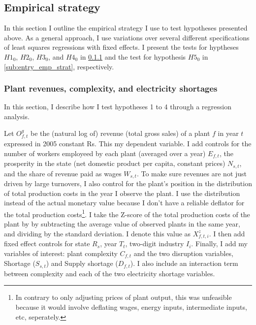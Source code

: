 \documentclass[11pt]{article}
\begin{document}
\subsection{Empirical strategy}
\label{sec:emp_strat}

In this section I outline the empirical strategy I use to test hypotheses presented above. As a general approach, I use variations over several different specifications of least squares regressions with fixed effects. I present the tests for hyptheses $H1_0$, $H2_0$, $H3_0$, and $H4_0$ in \ref{sub:interaction_emp_strat} and the test for hypothesis $H5_0$ in \ref{sub:entry_emp_strat}, respectively.

\subsubsection{Plant revenues, complexity, and electricity shortages}\label{sub:interaction_emp_strat}

In this section, I describe how I test hypotheses 1 to 4 through a regression analysis.

Let $O^{g}_{f,t}$ be the (natural log of) revenue (total gross sales) of a plant $f$ in year $t$ expressed in 2005 constant Rs. This my dependent variable. I add controls for the number of workers employeed by each plant (averaged over a year) $E_{f,t}$, the prosperity in the state (net domestic product per capita, constant prices) $N_{s,t}$, and the share of revenue paid as wages $W_{s,t}$. To make sure revenues are not just driven by large turnovers, I also control for the plant's position in the distribution of total production costs in the year I observe the plant. I use the distribution instead of the actual monetary value because I don't have a reliable deflator for the total production costs\footnote{In contrary to only adjusting prices of plant output, this was unfeasible because it would involve deflating wages, energy inputs, intermediate inputs, etc, seperately.}. I take the Z-score of the total production costs of the plant by by subtracting the average value of observed plants in the same year, and dividing by the standard deviation. I denote this value as $X^{z}_{f,t,i}$. I then add fixed effect controls for state $R_{s}$, year $T_{t}$, two-digit industry $I_i$. Finally, I add my variables of interest: plant complexity $C_{f,t}$ and the two disruption variables, Shortage ($S_{s,t}$) and Supply shortage ($D_{f,t}$). I also include an interaction term between complexity and each of the two electricity shortage variables.
\end{document}
